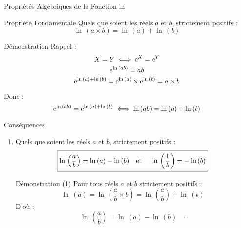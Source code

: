 \documentclass{cours}
\begin{document}
    \begin{Gpartie}{Propriétés Algébriques de la Fonction ln}
        \begin{Spartie}{Propriété Fondamentale}
            Quels que soient les réels $a$ et $b$, strictement positifs :
            \[\boxed{\ln\,(a\times b)=\ln\,(a)+\ln\,(b)}\]
            \begin{SSpartie}{Démonstration}
                Rappel : \[X=Y\iff \mathrm{e}^X=\mathrm{e}^Y\]
                \[\mathrm{e}^{\ln\,(ab)}=ab\]
                \[\mathrm{e}^{\ln\,(a)+\ln\,(b)}=\mathrm{e}^{\ln\,(a)}\times \mathrm{e}^{\ln\,(b)}=a\times b\]

                Donc : \[\mathrm{e}^{\ln\,(ab)}=\mathrm{e}^{\ln\,(a)+\ln\,(b)}\iff\ln\,(ab)=\ln\,(a)+\ln\,(b)\]
            \end{SSpartie}
        \end{Spartie}
        \begin{Spartie}{Conséquences}
            \begin{enumerate}[(1)]
                \item Quels que soient les réels $a$ et $b$, strictement positifs :
                \[\boxed{\ln\,\left(\frac{a}{b}\right)=\ln\,(a)-\ln\,(b)\text{\quad et \quad}\ln\,\left(\frac{1}{b}\right)=-\ln\,(b)}\]
                \begin{SSpartie}{Démonstration (1)} 
                    Pour tous réels $a$ et $b$ strictement positifs : \[\ln\,(a)=\ln\,\left(\frac{a}{b}\times b\right)=\ln\,\left(\frac{a}{b}\right)+\ln\,(b)\]
                    D'où : \[\ln\,\left(\frac{a}{b}\right)=\ln\,(a)-\ln\,(b)\quad\square\]


\end{SSpartie}
\end{enumerate}
\end{Spartie}
\end{Gpartie}
\end{document}

